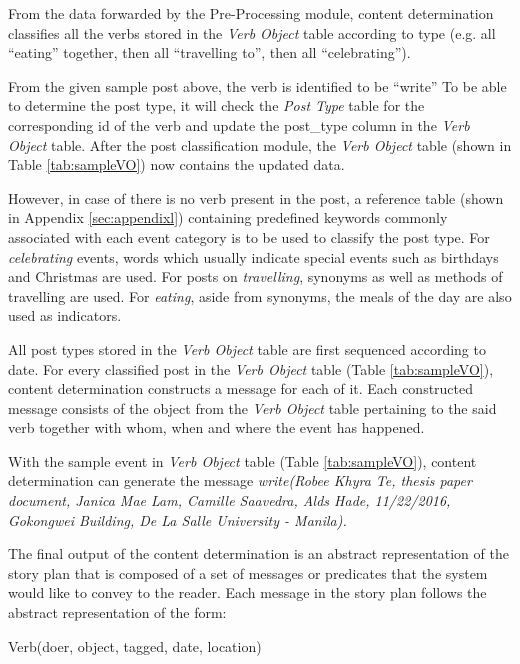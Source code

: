 From the data forwarded by the Pre-Processing module, content determination classifies all the verbs stored in the \textit{Verb Object} table according to type (e.g. all ``eating'' together, then all ``travelling to'', then all ``celebrating'').

From the given sample post above, the verb is identified to be ``write'' To be able to determine the post type, it will check the \textit{Post Type} table for the corresponding id of the verb and update the post\_type column in the \textit{Verb Object} table. After the post classification module, the \textit{Verb Object} table (shown in Table  \ref{tab:sampleVO}) now contains the updated data.

However, in case of there is no verb present in the post, a reference table (shown in Appendix \ref{sec:appendixl}) containing predefined keywords commonly associated with each event category is to be used to classify the post type. For \textit{celebrating} events, words which usually indicate special events such as birthdays and Christmas are used. For posts on \textit{travelling}, synonyms as well as methods of travelling are used. For \textit{eating}, aside from synonyms, the meals of the day are also used as indicators.

All post types stored in the \textit{Verb Object} table are first sequenced according to date. For every classified post in the \textit{Verb Object} table (Table \ref{tab:sampleVO}), content determination constructs a message for each of it. Each constructed message consists of the object from the \textit{Verb Object} table pertaining to the said verb together with whom, when and where the event has happened.

With the sample event in \textit{Verb Object} table (Table \ref{tab:sampleVO}), content determination can generate the message \textit{write(Robee Khyra Te, thesis paper document, Janica Mae Lam, Camille Saavedra, Alds Hade, 11/22/2016, Gokongwei Building, De La Salle University - Manila).} 

The final output of the content determination is an abstract representation of the story plan that is composed of a set of messages or predicates that the system would like to convey to the reader. Each message in the story plan follows the abstract representation of the form:
\begin{center}Verb(doer, object, tagged, date, location) \end{center}

